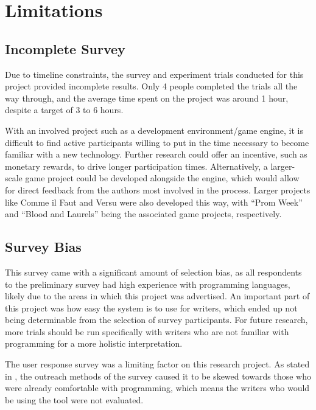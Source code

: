 \section{Limitations} \label{sec:Limitations}

\subsection{Incomplete Survey} \label{sec:IncompleteSurvey}

Due to timeline constraints, the survey and experiment trials conducted for this
project provided incomplete results. Only 4 people completed the trials all the
way through, and the average time spent on the project was around 1 hour, despite
a target of 3 to 6 hours.

With an involved project such as a development environment\slash game engine, it
is difficult to find active participants willing to put in the time necessary to
become familiar with a new technology. Further research could offer an incentive,
such as monetary rewards, to drive longer participation times. Alternatively, a
larger-scale game project could be developed alongside the engine, which would allow for
direct feedback from the authors most involved in the process. Larger projects
like Comme il Faut \cite{mccoy_social_2014} and Versu \cite{nelson_prompter_2014} were
also developed this way, with ``Prom Week'' and ``Blood and Laurels'' being
the associated game projects, respectively.

\subsection{Survey Bias} \label{sec:SurveyBias}

This survey came with a significant amount of selection bias, as all respondents
to the preliminary survey had high experience with programming languages,
likely due to the areas in which this project was advertised. An important part of
this project was how easy the system is to use for writers, which ended up not
being determinable from the selection of survey participants. For future research,
more trials should be run specifically with writers who are not familiar
with programming for a more holistic interpretation.

The user response survey was a limiting factor on this research project. As stated
in , the outreach methods of the survey caused it to be skewed
towards those who were already comfortable with programming, which means the writers
who would be using the tool were not evaluated.

